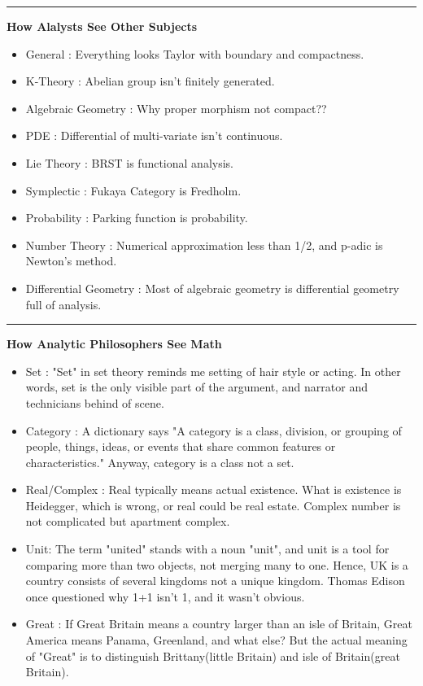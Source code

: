 \documentclass{article}
\begin{document}
\noindent\rule{\textwidth}{0.4pt}

\noindent
\textbf{How Alalysts See Other Subjects}

\begin{itemize}
\item General : Everything looks Taylor with boundary and compactness.
\item K-Theory : Abelian group isn't finitely generated.
\item Algebraic Geometry : Why proper morphism not compact??
\item PDE : Differential of multi-variate isn't continuous.
\item Lie Theory : BRST is functional analysis.
\item Symplectic : Fukaya Category is Fredholm.
\item Probability : Parking function is probability.
\item Number Theory : Numerical approximation less than 1/2, and p-adic is Newton's method.
\item Differential Geometry : Most of algebraic geometry is differential geometry full of analysis.
\end{itemize}



\noindent\rule{\textwidth}{0.4pt}

\noindent
\textbf{How Analytic Philosophers See Math}

\begin{itemize}
\item Set : "Set" in set theory reminds me setting of hair style or acting. In other words, set is the only visible part of the argument,
and narrator and technicians behind of scene.
\item Category : A dictionary says "A category is a class, division, or grouping of people, things, ideas, 
or events that share common features or characteristics." Anyway, category is a class not a set.
\item Real/Complex : Real typically means actual existence. What is existence is Heidegger, which is wrong, or real could be real estate.
Complex number is not complicated but apartment complex.
\item Unit: The term "united" stands with a noun "unit", and unit is a tool for comparing more than two objects, 
not merging many to one. Hence, UK is a country consists of several kingdoms not a unique kingdom. 
Thomas Edison once questioned why 1+1 isn't 1, and it wasn't obvious.
\item Great : If Great Britain means a country larger than an isle of Britain, Great America means Panama, Greenland, and what else?
But the actual meaning of "Great" is to distinguish Brittany(little Britain) and isle of Britain(great Britain).
\end{itemize}
\end{document}
